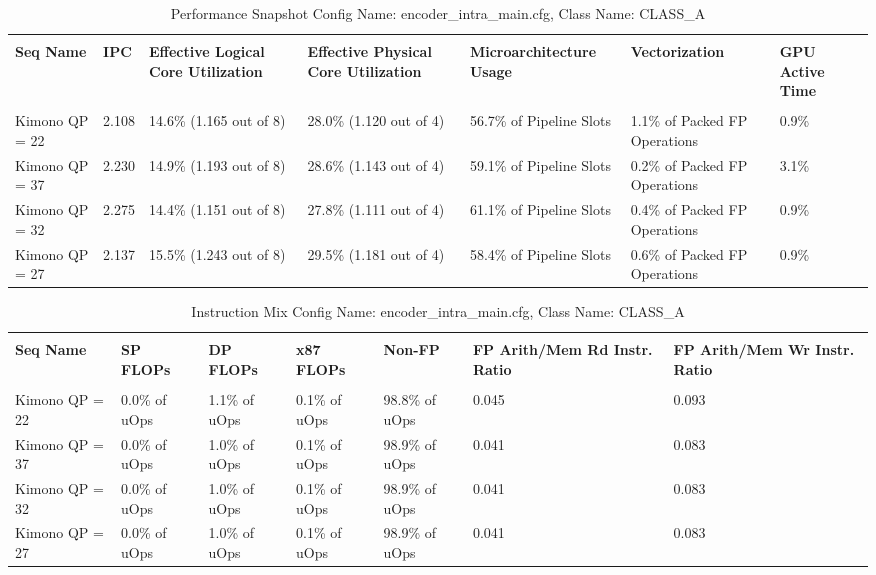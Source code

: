 \documentclass{article}%
\begin{document}
\begin{longtabu}{| X[l] | X[l] | X[l] | X[l] | X[l] | X[l] | X[l] |}%
\caption{%
Performance Snapshot\newline%
 Config Name: encoder\_intra\_main.cfg,\newline%
 Class Name: CLASS\_A\newline%
%
}%
\hline%
&&&&&&\\%
\textbf{Seq Name}&\textbf{IPC}&\textbf{Effective Logical Core Utilization}&\textbf{Effective Physical Core Utilization}&\textbf{Microarchitecture Usage}&\textbf{Vectorization}&\textbf{GPU Active Time}\\%
&&&&&&\\%
\hline%
\endhead%
Kimono\newline%
 QP = 22&2.108&14.6\% (1.165 out of 8)&28.0\% (1.120 out of 4)&56.7\% of Pipeline Slots&1.1\% of Packed FP Operations&0.9\%\\%
\hline%
Kimono\newline%
 QP = 37&2.230&14.9\% (1.193 out of 8)&28.6\% (1.143 out of 4)&59.1\% of Pipeline Slots&0.2\% of Packed FP Operations&3.1\%\\%
\hline%
Kimono\newline%
 QP = 32&2.275&14.4\% (1.151 out of 8)&27.8\% (1.111 out of 4)&61.1\% of Pipeline Slots&0.4\% of Packed FP Operations&0.9\%\\%
\hline%
Kimono\newline%
 QP = 27&2.137&15.5\% (1.243 out of 8)&29.5\% (1.181 out of 4)&58.4\% of Pipeline Slots&0.6\% of Packed FP Operations&0.9\%\\%
\hline%
\end{longtabu}%
\begin{longtabu}{| X[l] | X[l] | X[l] | X[l] | X[l] | X[l] | X[l] |}%
\caption{%
Instruction Mix\newline%
 Config Name: encoder\_intra\_main.cfg,\newline%
 Class Name: CLASS\_A\newline%
%
}%
\hline%
&&&&&&\\%
\textbf{Seq Name}&\textbf{SP FLOPs}&\textbf{DP FLOPs}&\textbf{x87 FLOPs}&\textbf{Non{-}FP}&\textbf{FP Arith/Mem Rd Instr. Ratio}&\textbf{FP Arith/Mem Wr Instr. Ratio}\\%
&&&&&&\\%
\hline%
\endhead%
Kimono\newline%
 QP = 22&0.0\% of uOps&1.1\% of uOps&0.1\% of uOps&98.8\% of uOps&0.045&0.093\\%
\hline%
Kimono\newline%
 QP = 37&0.0\% of uOps&1.0\% of uOps&0.1\% of uOps&98.9\% of uOps&0.041&0.083\\%
\hline%
Kimono\newline%
 QP = 32&0.0\% of uOps&1.0\% of uOps&0.1\% of uOps&98.9\% of uOps&0.041&0.083\\%
\hline%
Kimono\newline%
 QP = 27&0.0\% of uOps&1.0\% of uOps&0.1\% of uOps&98.9\% of uOps&0.041&0.083\\%
\hline%
\end{longtabu}%
\end{document}
